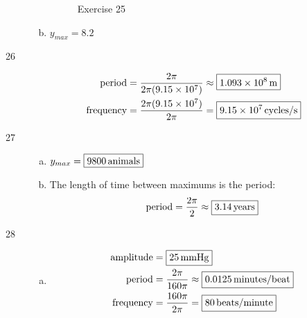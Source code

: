 \documentclass{exam}
\begin{document}
\begin{description}
\begin{enumerate}[(a)]
\begin{figure}[H]
              Exercise 25
            \end{figure}

          \item $y_{max} = \boxed{ 8.2 }$

        \end{enumerate}

      \item[26]
        \begin{align*}
          \text{period}    & = \frac{2 \pi}{2 \pi (9.15 \times 10^7)} \approx \boxed{ \unit[1.093 \times 10^8]{m} } \\
          \text{frequency} & = \frac{2 \pi (9.15 \times 10^7)}{2 \pi} = \boxed{ \unit[9.15 \times 10^7]{cycles/s} } \\
        \end{align*}

      \item[27]
        \pagebreak
        \begin{enumerate}[(a)]
          \item $y_{max} = \boxed{ \unit[9800]{animals} }$

          \item The length of time between maximums is the period:
            \[
              \text{period} = \frac{2 \pi}{2} \approx \boxed{ \unit[3.14]{years} } \\
            \]
        \end{enumerate}

      \item[28]
        \pagebreak
        \begin{enumerate}[(a)]
          \item 
            \begin{align*}
              \text{amplitude} & = \boxed{ \unit[25]{mmHg} } \\
              \text{period}    & = \frac{2 \pi}{160 \pi} \approx \boxed{ \unit[0.0125]{minutes/beat} } \\
              \text{frequency} & = \frac{160 \pi}{2 \pi} = \boxed{ \unit[80]{beats/minute} } \\
            \end{align*}


\end{enumerate}
\end{description}
\end{document}
